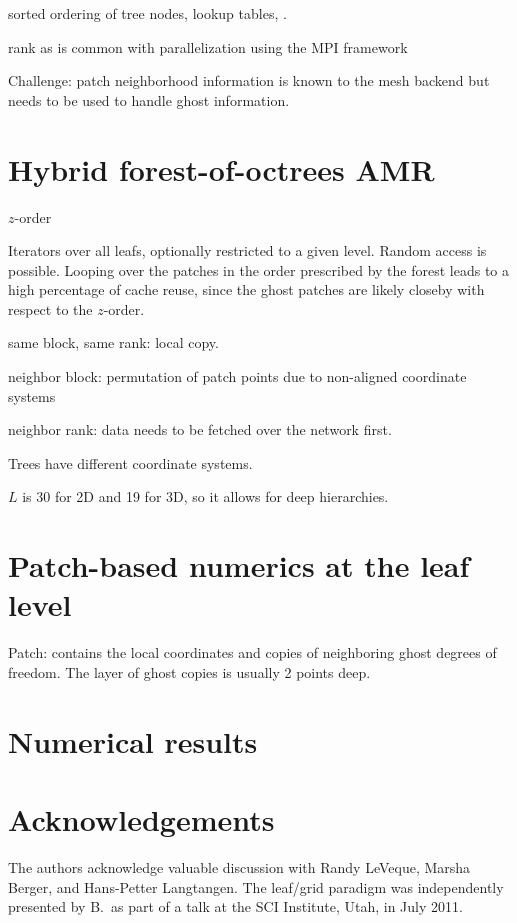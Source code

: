 \documentclass{IOS-Book-Article}     %
\begin{document}
sorted ordering of tree nodes, lookup tables, .



rank as is common with parallelization using the MPI framework

Challenge: patch neighborhood information is known to the mesh backend
but needs to be used to handle ghost information.



\section*{Hybrid forest-of-octrees AMR}


$z$-order

Iterators over all leafs, optionally restricted to a given level.
Random access is possible.  Looping over the patches in the order prescribed
by the forest leads to a high percentage of cache reuse, since the ghost
patches are likely closeby with respect to the $z$-order.


same block, same rank: local copy.

neighbor block: permutation of patch points due to non-aligned
coordinate systems

neighbor rank: data needs to be fetched over the network first.

Trees have different coordinate systems.

$L$ is 30 for 2D and 19 for 3D, so it allows for deep hierarchies.



\section*{Patch-based numerics at the leaf level}


Patch: contains the local coordinates and copies of neighboring ghost degrees
of freedom.  The layer of ghost copies is usually 2 points deep.


\section*{Numerical results}



\section*{Acknowledgements}

The authors acknowledge valuable discussion with Randy LeVeque, Marsha Berger,
and Hans-Petter Langtangen.  The leaf/grid paradigm was independently presented
by B.\ as part of a talk at the SCI Institute, Utah, in July 2011.




\end{document}
